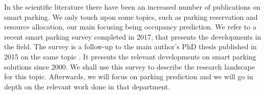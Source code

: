 
In the scientific literature there have been an increased number of publications on smart parking. We only touch upon some topics, such as parking reservation and resource allocation, our main focusing being occupancy prediction. We refer to a recent smart parking survey completed in 2017, that presents the developments in the field. The survey \cite{lin} is a follow-up to the main author's PhD thesis published in 2015 on the same topic \cite{lin2}. It presents the relevant developments on smart parking solutions since 2000. We shall use this survey to describe the research landscape for this topic. Afterwards, we will focus on parking prediction and we will go in depth on the relevant work done in that department. 



